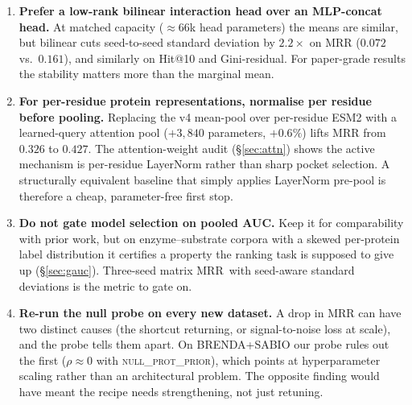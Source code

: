 \documentclass[11pt,a4paper]{article}
\newcommand{\nullprior}{\textsc{null\_prot\_prior}\xspace}
\newcommand{\matmrr}{matrix MRR}
\begin{document}
\begin{enumerate}[leftmargin=*,itemsep=2pt,topsep=2pt]
        degrades to near-random sampling. Our Stage-1 sweep
        (Appendix~\ref{sec:hpsweep}) shows matrix MRR rising
        monotonically with coverage up to the top of the swept grid, so
        we recommend setting \texttt{hard\_pool\_size} to
        \textbf{at least $\sim\!50\%$} of $n_{\text{train\_proteins}}$
        (peaks observed at $50$--$52\%$, no plateau yet) and monitoring
        \texttt{pos\_above\_neg\_max} to confirm the pool is producing
        informative negatives (it should rise into $0.95+$ over
        training).
  \item \textbf{Prefer a low-rank bilinear interaction head over an
        MLP-concat head.} At matched capacity ($\approx\!66$k head
        parameters) the means are similar, but bilinear cuts
        seed-to-seed standard deviation by $2.2\times$ on MRR
        ($0.072$ vs.\ $0.161$), and similarly on Hit@10 and
        Gini-residual. For paper-grade results the stability matters
        more than the marginal mean.
  \item \textbf{For per-residue protein representations, normalise per
        residue before pooling.} Replacing the v4 mean-pool over
        per-residue ESM2 with a learned-query attention pool
        ($+3{,}840$ parameters, $+0.6\%$) lifts MRR from $0.326$ to
        $0.427$. The attention-weight audit (\S\ref{sec:attn}) shows
        the active mechanism is per-residue LayerNorm rather than
        sharp pocket selection. A structurally equivalent baseline
        that simply applies LayerNorm pre-pool is therefore a cheap,
        parameter-free first stop.
  \item \textbf{Do not gate model selection on pooled AUC.} Keep it
        for comparability with prior work, but on enzyme--substrate
        corpora with a skewed per-protein label distribution it
        certifies a property the ranking task is supposed to give up
        (\S\ref{sec:gauc}). Three-seed \matmrr\ with seed-aware
        standard deviations is the metric to gate on.
  \item \textbf{Re-run the null probe on every new dataset.} A drop
        in MRR can have two distinct causes (the shortcut returning,
        or signal-to-noise loss at scale), and the probe tells them
        apart. On BRENDA+SABIO our probe rules out the first
        ($\rho \approx 0$ with \nullprior), which points at
        hyperparameter scaling rather than an architectural problem.
        The opposite finding would have meant the recipe needs
        strengthening, not just retuning.
\end{enumerate}
\end{document}
